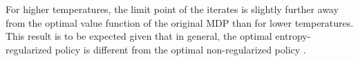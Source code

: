 \documentclass[twoside,11pt]{article}
\begin{document}
For higher temperatures, the limit point of the iterates is slightly further away from the optimal value function of the original MDP than for lower temperatures. This result is to be expected given that in general, the optimal entropy-regularized policy is different from the optimal non-regularized policy \citep{geist2019theory}.


  
  
  
\end{document}
